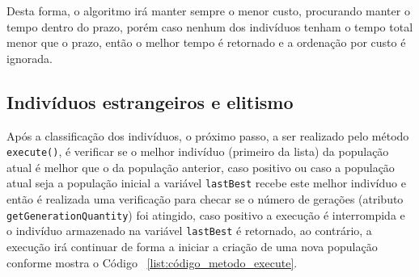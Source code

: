 \par Desta forma, o algoritmo irá manter sempre o menor custo, procurando manter o tempo dentro do prazo, porém caso nenhum dos indivíduos tenham o tempo total menor que o prazo, então o melhor tempo é retornado e a ordenação por custo é ignorada.

\subsection{Indivíduos estrangeiros e elitismo}

\par Após a classificação dos indivíduos, o próximo passo, a ser realizado pelo método \texttt{execute()}, é verificar
se o melhor indivíduo (primeiro da lista) da população atual é melhor que o da população anterior, caso positivo ou
caso a população atual seja a população inicial a variável \texttt{lastBest} recebe este melhor indivíduo e então é 
realizada uma verificação para checar se o número de gerações (atributo \texttt{getGenerationQuantity}) foi atingido, 
caso positivo a execução é interrompida e o indivíduo armazenado na variável \texttt{lastBest} é retornado, ao contrário, 
a execução irá continuar de forma a iniciar a criação de uma nova população conforme mostra o Código ~\ref{list:código_metodo_execute}.

\newpage

